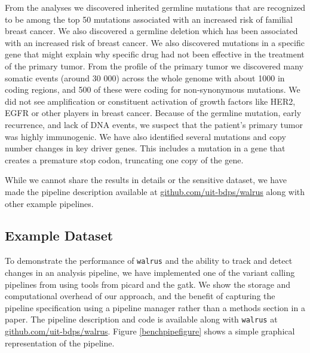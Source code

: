 From the analyses we discovered inherited germline mutations that are recognized
to be among the top 50 mutations associated with an increased risk of familial
breast cancer. We also discovered a germline deletion which has been associated
with an increased risk of breast cancer. We also discovered mutations in a
specific gene that might explain why specific drug had not been effective in the
treatment of the primary tumor. From the profile of the primary tumor we
discovered many somatic events (around 30 000) across the whole genome with
about 1000 in coding regions, and 500 of these were coding for non-synonymous
mutations.  We did not see amplification or constituent activation of growth
factors like HER2, EGFR or other players in breast cancer. Because of the
germline mutation, early recurrence, and lack of DNA events, we suspect that the
patient's primary tumor was highly immunogenic. We have also identified several
mutations and copy number changes in key driver genes. This includes a mutation
in a gene that creates a premature stop codon, truncating one copy of the gene.

While we cannot share the results in details or the sensitive dataset, we have
made the pipeline description available at \url{github.com/uit-bdps/walrus}
along with other example pipelines. 

\subsection{Example Dataset}
To demonstrate the performance of \texttt{walrus} and the ability to track and
detect changes in an analysis pipeline, we have implemented one of the variant
calling pipelines from \cite{cornish2015comparison} using tools from picard and
the \gls{gatk}. We show the storage and computational overhead of our approach,
and the benefit of capturing the pipeline specification using a pipeline manager
rather than a methods section in a paper.  The pipeline description and code is
available along with \texttt{walrus} at \url{github.com/uit-bdps/walrus}. Figure
\ref{benchpipefigure} shows a simple graphical representation of the pipeline. 

